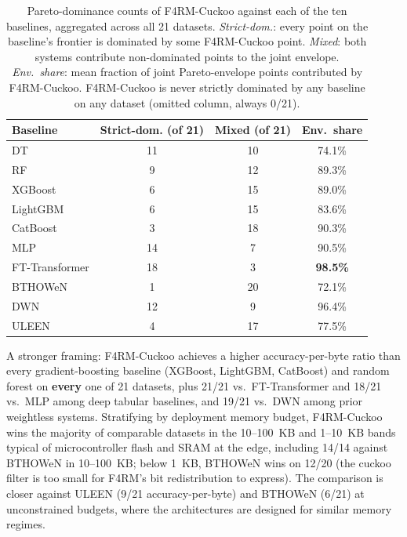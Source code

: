 \begin{table}[ht!]
 \centering
 \caption{Pareto-dominance counts of F4RM-Cuckoo against each of the ten baselines, aggregated across all 21 datasets. \emph{Strict-dom.}: every point on the baseline's frontier is dominated by some F4RM-Cuckoo point. \emph{Mixed}: both systems contribute non-dominated points to the joint envelope. \emph{Env.~share}: mean fraction of joint Pareto-envelope points contributed by F4RM-Cuckoo. F4RM-Cuckoo is never strictly dominated by any baseline on any dataset (omitted column, always 0/21).}
 \label{tab:pareto-summary}
 \small
 \setlength{\tabcolsep}{10pt}
 \begin{tabular}{lccc}
 \toprule
 Baseline & Strict-dom. (of 21) & Mixed (of 21) & Env.~share \\
 \midrule
 DT & 11 & 10 & 74.1\% \\
 RF & 9 & 12 & 89.3\% \\
 XGBoost & 6 & 15 & 89.0\% \\
 LightGBM & 6 & 15 & 83.6\% \\
 CatBoost & 3 & 18 & 90.3\% \\
 MLP & 14 & 7 & 90.5\% \\
 FT-Transformer & 18 & 3 & \textbf{98.5\%} \\
 BTHOWeN & 1 & 20 & 72.1\% \\
 DWN & 12 & 9 & 96.4\% \\
 ULEEN & 4 & 17 & 77.5\% \\
 \bottomrule
 \end{tabular}
\end{table}

A stronger framing: F4RM-Cuckoo achieves a higher accuracy-per-byte ratio than every gradient-boosting baseline (XGBoost, LightGBM, CatBoost) and random forest on \textbf{every} one of 21 datasets, plus 21/21 vs.~FT-Transformer and 18/21 vs.~MLP among deep tabular baselines, and 19/21 vs.~DWN among prior weightless systems. Stratifying by deployment memory budget, F4RM-Cuckoo wins the majority of comparable datasets in the 10--100~KB and 1--10~KB bands typical of microcontroller flash and SRAM at the edge, including 14/14 against BTHOWeN in 10--100~KB; below 1~KB, BTHOWeN wins on 12/20 (the cuckoo filter is too small for F4RM's bit redistribution to express). The comparison is closer against ULEEN (9/21 accuracy-per-byte) and BTHOWeN (6/21) at unconstrained budgets, where the architectures are designed for similar memory regimes.

